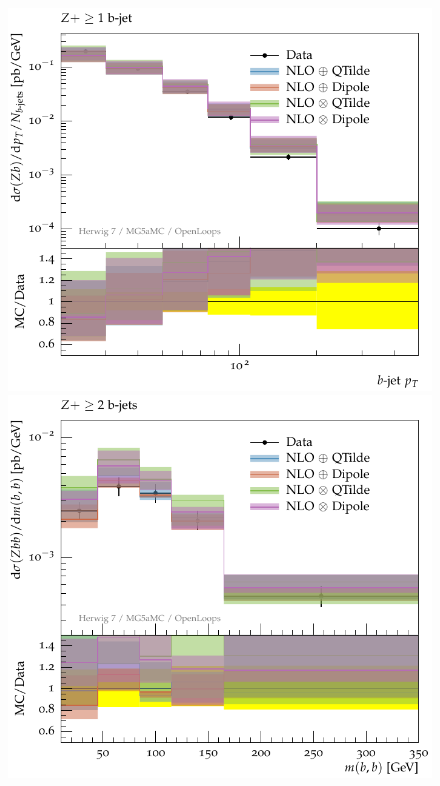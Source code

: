 \documentclass[11pt]{cernrep}
\begin{document}
\begin{figure}[htbp]
\begin{center}
   \includegraphics[scale=0.65]{figs/zbb/herwigzbb/atlas-d03-x01-y01.pdf} 
   \includegraphics[scale=0.65]{figs/zbb/herwigzbb/atlas-d23-x01-y01.pdf} \\

\end{center}
\end{figure}
\end{document}
